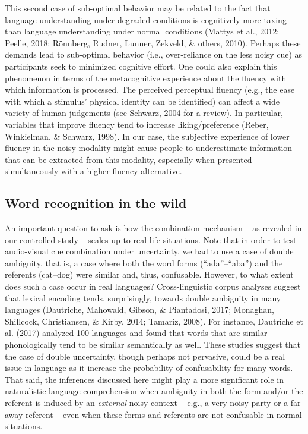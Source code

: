 \documentclass[english,,man,floatsintext]{apa6}
\theoremstyle{definition}
\theoremstyle{definition}
\theoremstyle{definition}
\theoremstyle{remark}
\begin{document}
This second case of sub-optimal behavior may be related to the fact that
language understanding under degraded conditions is cognitively more
taxing than language understanding under normal conditions (Mattys et
al., 2012; Peelle, 2018; Rönnberg, Rudner, Lunner, Zekveld, \& others,
2010). Perhaps these demands lead to sub-optimal behavior (i.e.,
over-reliance on the less noisy cue) as participants seek to minimized
cognitive effort. One could also explain this phenomenon in terms of the
metacognitive experience about the fluency with which information is
processed. The perceived perceptual fluency (e.g., the ease with which a
stimulus' physical identity can be identified) can affect a wide variety
of human judgements (see Schwarz, 2004 for a review). In particular,
variables that improve fluency tend to increase liking/preference
(Reber, Winkielman, \& Schwarz, 1998). In our case, the subjective
experience of lower fluency in the noisy modality might cause people to
underestimate information that can be extracted from this modality,
especially when presented simultaneously with a higher fluency
alternative.

\subsection{Word recognition in the
wild}\label{word-recognition-in-the-wild}

An important question to ask is how the combination mechanism -- as
revealed in our controlled study -- scales up to real life situations.
Note that in order to test audio-visual cue combination under
uncertainty, we had to use a case of double ambiguity, that is, a case
where both the word forms (\enquote{ada}--\enquote{aba}) and the
referents (cat--dog) were similar and, thus, confusable. However, to
what extent does such a case occur in real languages? Cross-linguistic
corpus analyses suggest that lexical encoding tends, surprisingly,
towards double ambiguity in many languages (Dautriche, Mahowald, Gibson,
\& Piantadosi, 2017; Monaghan, Shillcock, Christiansen, \& Kirby, 2014;
Tamariz, 2008). For instance, Dautriche et al. (2017) analyzed 100
languages and found that words that are similar phonologically tend to
be similar semantically as well. These studies suggest that the case of
double uncertainty, though perhaps not pervasive, could be a real issue
in language as it increase the probability of confusability for many
words. That said, the inferences discussed here might play a more
significant role in naturalistic language comprehension when ambiguity
in both the form and/or the referent is induced by an \emph{external}
noisy context -- e.g., a very noisy party or a far away referent -- even
when these forms and referents are not confusable in normal situations.
\end{document}
